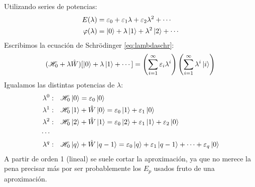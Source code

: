 Utilizando series de potencias:
\begin{align}
  E(\lambda) &= \varepsilon_0 + \varepsilon_1 \lambda + \varepsilon_2 \lambda^2
  + \cdots \\
  \varphi(\lambda) &= \ket{0} + \lambda \ket{1} + \lambda^2 \ket{2} 
  + \cdots 
                  \label{eq:varphilamb}
\end{align}
Escribimos la ecuación de Schrödinger \eqref{eq:lambdaschr}:
\begin{equation}
  ( \mathscr{H} _0 + \lambda \hat{W})[\ket{0} + \lambda \ket{1} +
  \cdots] = \left( \sum_{i=1}^\infty \varepsilon_i \lambda^i  \right)
  \left( \sum_{i=1}^\infty \lambda^i \ket{i}  \right)
\end{equation}
Igualamos las distintas potencias de $\lambda$:
\begin{equation}
  \begin{split}
    \lambda^0 &:\ \  \mathscr{H} _0 \ket{0} = \varepsilon_0 \ket{0} \\
    \lambda^1 &:\ \  \mathscr{H} _0 \ket{1} + \hat{W} \ket{0} =
    \varepsilon_0 \ket{1}+ \varepsilon_1 \ket{0} \\
    \lambda^2 &:\ \  \mathscr{H} _0 \ket{2} + \hat{W} \ket{1} =
    \varepsilon_0 \ket{2} +\varepsilon_1 \ket{1} + \varepsilon_2 \ket{0} \\
    \cdots & \\
    \lambda^q &:\ \  \mathscr{H} _0 \ket{q} + \hat{W} \ket{q-1} =
    \varepsilon_0 \ket{q}+ \varepsilon_1 \ket{q-1} + \cdots + \varepsilon_q \ket{0} \\
  \end{split}
\end{equation}
A partir de orden 1 (lineal) se suele cortar la aproximación, ya que
no merece la pena precisar más por ser probablemente los $E_p$ usados
fruto de una aproximación.

